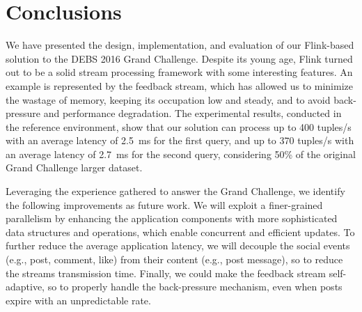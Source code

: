 \section{Conclusions}
\label{sec:conclusions}

We have presented the design, implementation, and evaluation of our Flink-based solution to the DEBS 2016 Grand Challenge.
%
Despite its young age, Flink turned out to be a solid stream processing framework with some interesting features.   
%
An example is represented by the feedback stream, which has allowed us to minimize the wastage of memory, keeping its occupation low and steady, and 
to avoid back-pressure and performance degradation.
%
The experimental results, conducted in the reference environment, show that our solution can process up to 400 tuples/s with an average latency of 2.5~ms for the first query, and up to 370 tuples/s with an average latency of 2.7~ms for the second query, considering 50\% of the original Grand Challenge larger dataset.  

Leveraging the experience gathered to answer the Grand Challenge, we identify the following improvements as future work. 
%
We will exploit a finer-grained parallelism by enhancing the application components with more sophisticated data structures and operations, which enable concurrent and efficient updates.
%
To further reduce the average application latency, we will decouple the social events (e.g., post, comment, like) from their content (e.g., post message), so to reduce the streams transmission time.
%
Finally, we could make the feedback stream self-adaptive, so to properly handle the  back-pressure mechanism, even when posts expire with an unpredictable rate.